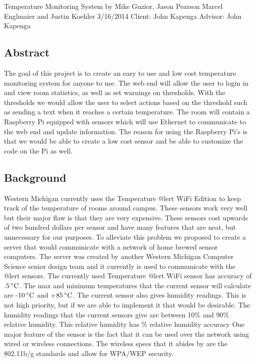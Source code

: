 \documentclass{report}
\begin{document}
\begin{titlepage}

\vspace*{\fill}
\begin{center}
Temperature Monitoring System
by Mike Guzior, Jason Pearson
Marcel Englmaier and Justin Koehler
3/16/2014
Client: John Kapenga
Advisor: John Kapenga
\end{center}
\vspace*{\fill}
\end{titlepage}
\newpage
\tableofcontents
\newpage

\subsection*{Abstract}
The goal of this project is to create an easy to use and low cost temperature monitoring system for anyone to use. The web end will allow the user to login in and view room statistics, as well as set warnings on thresholds. With the thresholds we would allow the user to select actions based on the threshold such as sending a text when it reaches a certain temperature.  The room will contain a Raspberry Pi equipped with sensors which will use Ethernet to communicate to the web end and update information. The reason for using the Raspberry Pi’s is that we would be able to create a low cost sensor and be able to customize the code on the Pi as well. 
\newpage
\subsection*{Background}
	Western Michigan currently uses the Temperature @lert WiFi Edition to keep track of the temperature of rooms around campus. These sensors work very well but their major flaw is that they are very expensive. These sensors cost upwards of two hundred dollars per sensor and have many features that are neat, but unnecessary for our purposes. To alleviate this problem we proposed to create a server that would communicate with a network of home brewed sensor computers. The server was created by another Western Michigan Computer Science senior design team and it currently is used to communicate with the @lert sensors.  
	\newline
	\indent
	The currently used Temperature @lert WiFi sensor has accuracy of \pm$.5\,^{\circ}{\rm C}$. The max and minimum temperatures that the current sensor will calculate are -$10\,^{\circ}{\rm C}$ and +$85\,^{\circ}{\rm C}$. The current sensor also gives humidity readings. This is not high priority, but if we are able to implement it that would be desirable. The humidity readings that the current sensors give are between 10\% and 90\% relative humidity. This relative humidity has \% relative humidity accuracy One major feature of the sensor is the fact that it can be used over the network using wired or wireless connections. The wireless specs that it abides by are the 802.11b/g standards and allow for WPA/WEP security. 
\end{document}
